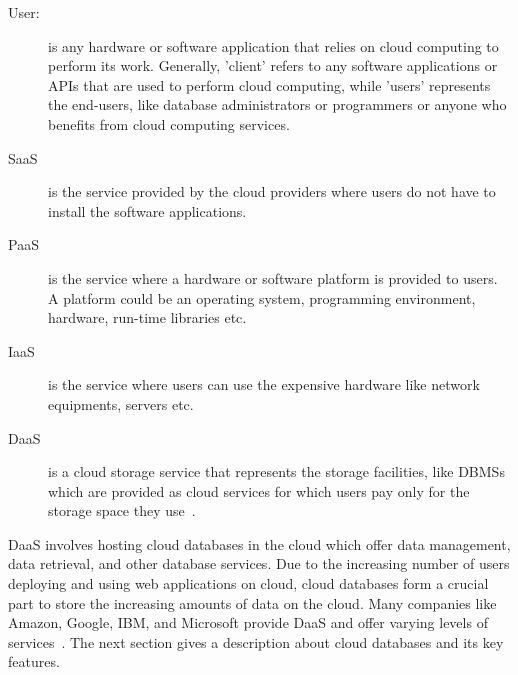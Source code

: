\begin{description}

	\item [User:] is any hardware or software application that relies on cloud
	computing to perform its work.  Generally,   'client' refers to any software applications or
	\acp{API}  that are used to perform cloud computing,  
	while 'users' represents the end-users,   like  database administrators or
	programmers or anyone who benefits from cloud computing services. 
	
	\item [\acf{SaaS}] is the service provided by the cloud
	providers where users do not have to install the software applications. 
	
	\item [\acf{PaaS}] is the service where a hardware or
	software platform is provided to users.  A platform could be an operating system,  
	programming environment,   hardware,   run-time libraries etc. 
	
	\item [\acf{IaaS}] is the service where users can use
	the expensive hardware like network equipments,   servers etc. 
	
	\item [\acf{DaaS}] is a cloud storage service  that represents
	the storage facilities,   like  \acp{DBMS} which are provided
	as cloud services for which users pay only for the storage space they
	use~\citep{Wuetal}.

\end{description}


\ac{DaaS} involves hosting cloud databases in the cloud which offer data
management,   data retrieval,   and other database services.  Due to the
increasing number of users deploying and using web applications on cloud, cloud
databases form a crucial part to store the increasing amounts of data on the
cloud.  Many companies like Amazon,   Google,   IBM,   and Microsoft provide
\ac{DaaS} and offer varying levels of services~\citep{Mateljan}. The next
section gives a description about cloud databases and its key features.